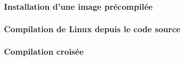 \subsubsection{Installation d'une image précompilée}

\subsubsection{Compilation de Linux depuis le code source}

\subsubsection{Compilation croisée}